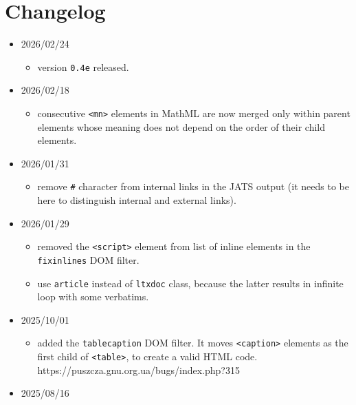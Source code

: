 \section{Changelog}\label{changelog}

\begin{itemize}
\item
  2026/02/24

  \begin{itemize}
  \tightlist
  \item
    version \texttt{0.4e} released.
  \end{itemize}
\item
  2026/02/18

  \begin{itemize}
  \tightlist
  \item
    consecutive \texttt{\textless{}mn\textgreater{}} elements in MathML
    are now merged only within parent elements whose meaning does not
    depend on the order of their child elements.
  \end{itemize}
\item
  2026/01/31

  \begin{itemize}
  \tightlist
  \item
    remove \texttt{\#} character from internal links in the JATS output
    (it needs to be here to distinguish internal and external links).
  \end{itemize}
\item
  2026/01/29

  \begin{itemize}
  \tightlist
  \item
    removed the \texttt{\textless{}script\textgreater{}} element from
    list of inline elements in the \texttt{fixinlines} DOM filter.
  \item
    use \texttt{article} instead of \texttt{ltxdoc} class, because the
    latter results in infinite loop with some verbatims.
  \end{itemize}
\item
  2025/10/01

  \begin{itemize}
  \tightlist
  \item
    added the \texttt{tablecaption} DOM filter. It moves
    \texttt{\textless{}caption\textgreater{}} elements as the first
    child of \texttt{\textless{}table\textgreater{}}, to create a valid
    HTML code. https://puszcza.gnu.org.ua/bugs/index.php?315
  \end{itemize}
\item
  2025/08/16


\end{itemize}
